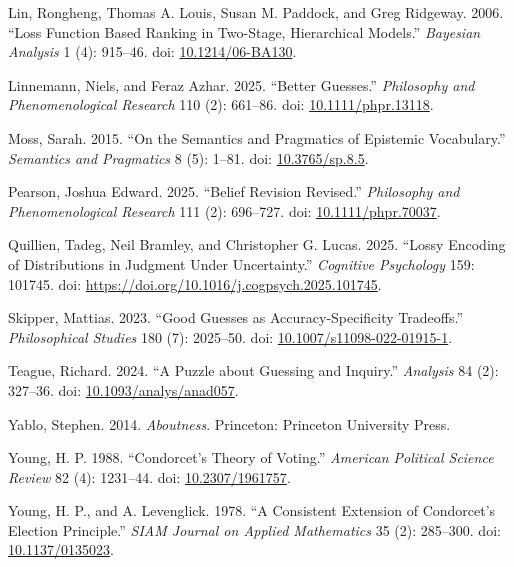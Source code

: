 \documentclass[
  11pt,
  letterpaper,
  DIV=11,
  numbers=noendperiod,
  twoside]{scrartcl}
\newlength{\cslhangindent}
\newenvironment{CSLReferences}[2] %
 {\begin{list}{}{%
  \setlength{\itemindent}{0pt}
  \setlength{\leftmargin}{0pt}
  \setlength{\parsep}{0pt}
  \ifodd #1
   \setlength{\leftmargin}{\cslhangindent}
   \setlength{\itemindent}{-1\cslhangindent}
  \fi
  \setlength{\itemsep}{#2\baselineskip}}}
 {\end{list}}
\begin{document}
\begin{CSLReferences}{1}{0}
Lin, Rongheng, Thomas A. Louis, Susan M. Paddock, and Greg Ridgeway.
2006. {``Loss Function Based Ranking in Two-Stage, Hierarchical
Models.''} \emph{Bayesian Analysis} 1 (4): 915--46. doi:
\href{https://doi.org/10.1214/06-BA130}{10.1214/06-BA130}.

Linnemann, Niels, and Feraz Azhar. 2025. {``Better Guesses.''}
\emph{Philosophy and Phenomenological Research} 110 (2): 661--86. doi:
\href{https://doi.org/10.1111/phpr.13118}{10.1111/phpr.13118}.

Moss, Sarah. 2015. {``On the Semantics and Pragmatics of Epistemic
Vocabulary.''} \emph{Semantics and Pragmatics} 8 (5): 1--81. doi:
\href{https://doi.org/10.3765/sp.8.5}{10.3765/sp.8.5}.

Pearson, Joshua Edward. 2025. {``Belief Revision Revised.''}
\emph{Philosophy and Phenomenological Research} 111 (2): 696--727. doi:
\href{https://doi.org/10.1111/phpr.70037}{10.1111/phpr.70037}.

Quillien, Tadeg, Neil Bramley, and Christopher G. Lucas. 2025. {``Lossy
Encoding of Distributions in Judgment Under Uncertainty.''}
\emph{Cognitive Psychology} 159: 101745. doi:
\url{https://doi.org/10.1016/j.cogpsych.2025.101745}.

Skipper, Mattias. 2023. {``Good Guesses as Accuracy-Specificity
Tradeoffs.''} \emph{Philosophical Studies} 180 (7): 2025--50. doi:
\href{https://doi.org/10.1007/s11098-022-01915-1}{10.1007/s11098-022-01915-1}.

Teague, Richard. 2024. {``A Puzzle about Guessing and Inquiry.''}
\emph{Analysis} 84 (2): 327--36. doi:
\href{https://doi.org/10.1093/analys/anad057}{10.1093/analys/anad057}.

Yablo, Stephen. 2014. \emph{Aboutness}. Princeton: Princeton University
Press.

Young, H. P. 1988. {``{Condorcet}'s Theory of Voting.''} \emph{American
Political Science Review} 82 (4): 1231--44. doi:
\href{https://doi.org/10.2307/1961757}{10.2307/1961757}.

Young, H. P., and A. Levenglick. 1978. {``A Consistent Extension of
{Condorcet}'s Election Principle.''} \emph{SIAM Journal on Applied
Mathematics} 35 (2): 285--300. doi:
\href{https://doi.org/10.1137/0135023}{10.1137/0135023}.

\end{CSLReferences}
\end{document}
